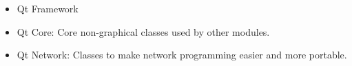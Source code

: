 
\begin{issues}
\issueDraft
\end{issues}

\begin{itemize}
\item Qt Framework
\item Qt Core: Core non-graphical classes used by other modules.
\item Qt Network: Classes to make network programming easier and more portable.
\end{itemize}

